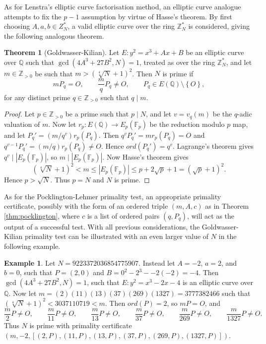 \documentclass{article}
\newcommand{\F}{\mathbb{F}}
\newcommand{\Z}{\mathbb{Z}}
\newcommand{\Q}{\mathbb{Q}}
\newcommand{\rb}[1]{\left( #1 \right)}
\renewcommand{\sb}[1]{\left[ #1 \right]}
\newcommand{\cb}[1]{\left\{ #1 \right\}}
\newcommand{\abs}[1]{\left\lvert #1 \right\rvert}
\theoremstyle{definition}\newtheorem*{definition}{Definition}
\theoremstyle{definition}\newtheorem*{example}{Example}
\theoremstyle{definition}\newtheorem*{remark}{Remark}
\newtheorem{theorem}[proposition]{Theorem}
\begin{document}
As for Lenstra's elliptic curve factorisation method, an elliptic curve analogue attempts to fix the $ p - 1 $ assumption by virtue of Hasse's theorem. By first choosing $ A, a, b \in Z_N^* $, a valid elliptic curve over the ring $ \Z_N^* $ is considered, giving the following analogous theorem.

\begin{theorem}[Goldwasser-Kilian]
Let $ E : y^2 = x^3 + Ax + B $ be an elliptic curve over $ \Q $ such that $ \gcd\rb{4A^3 + 27B^2, N} = 1 $, treated as over the ring $ \Z_N^* $, and let $ m \in \Z_{> 0} $ be such that $ m > \rb{\sqrt[4]{N} + 1}^2 $. Then $ N $ is prime if
$$ mP_q = O, \qquad \dfrac{m}{q}P_q \ne O, \qquad P_q \in E\rb{\Q} \setminus \cb{O}, $$
for any distinct prime $ q \in \Z_{> 0} $ such that $ q \mid m $.
\end{theorem}

\begin{proof}
Let $ p \in \Z_{> 0} $ be a prime such that $ p \mid N $, and let $ v = v_q\rb{m} $ be the $ q $-adic valuation of $ m $. Now let $ r_p : E\rb{\Q} \to E_p\rb{\F_p} $ be the reduction modulo $ p $ map, and let $ P_q' = \rb{m / q^v}r_p\rb{P_q} $. Then $ q^vP_q' = mr_p\rb{P_q} = O $ and $ q^{v - 1}P_q' = \rb{m / q}r_p\rb{P_q} \ne O $. Hence $ ord\rb{P_q'} = q^v $. Lagrange's theorem gives $ q^v \mid \abs{E_p\rb{\F_p}} $, so $ m \mid \abs{E_p\rb{\F_p}} $. Now Hasse's theorem gives
$$ \rb{\sqrt[4]{N} + 1}^2 < m \le \abs{E_p\rb{\F_p}} \le p + 2\sqrt{p} + 1 = \rb{\sqrt{p} + 1}^2. $$
Hence $ p > \sqrt{N} $. Thus $ p = N $ and $ N $ is prime.
\end{proof}

As for the Pocklington-Lehmer primality test, an appropriate primality certificate, possibly with the form of an ordered triple $ \rb{m, A, c} $ as in Theorem \ref{thm:pocklington}, where $ c $ is a list of ordered pairs $ \rb{q, P_q} $, will act as the output of a successful test. With all previous considerations, the Goldwasser-Kilian primality test can be illustrated with an even larger value of $ N $ in the following example.

\begin{example}
Let $ N = 9223372036854775907 $. Instead let $ A = -2 $, $ a = 2 $, and $ b = 0 $, such that $ P = \rb{2, 0} $ and $ B = 0^2 - 2^3 - -2\rb{-2} = -4 $. Then $ \gcd\rb{4A^3 + 27B^2, N} = 1 $, such that $ E : y^2 = x^3 - 2x - 4 $ is an elliptic curve over $ \Q $. Now let $ m = \rb{2}\rb{11}\rb{13}\rb{37}\rb{269}\rb{1327} = 3777382466 $ such that $ \rb{\sqrt[4]{N} + 1}^2 < 3037110719 < m $. Then $ ord\rb{P} = 2 $, so $ mP = O $, and
$$ \dfrac{m}{2}P \ne O, \qquad \dfrac{m}{11}P \ne O, \qquad \dfrac{m}{13}P \ne O, \qquad \dfrac{m}{37}P \ne O, \qquad \dfrac{m}{269}P \ne O, \qquad \dfrac{m}{1327}P \ne O. $$
Thus $ N $ is prime with primality certificate $ \rb{m, -2, \sb{\rb{2, P}, \rb{11, P}, \rb{13, P}, \rb{37, P}, \rb{269, P}, \rb{1327, P}}} $.
\end{example}
\end{document}
